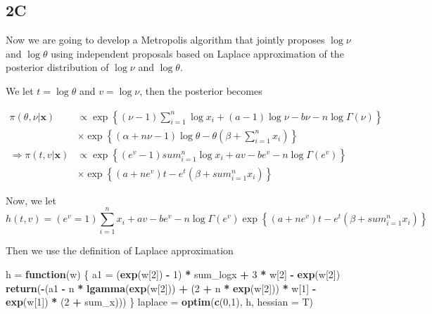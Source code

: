 \documentclass[]{article}
\newenvironment{Shaded}{\begin{snugshade}}{\end{snugshade}}
\newcommand{\KeywordTok}[1]{\textcolor[rgb]{0.13,0.29,0.53}{\textbf{#1}}}
\newcommand{\DataTypeTok}[1]{\textcolor[rgb]{0.13,0.29,0.53}{#1}}
\newcommand{\DecValTok}[1]{\textcolor[rgb]{0.00,0.00,0.81}{#1}}
\newcommand{\StringTok}[1]{\textcolor[rgb]{0.31,0.60,0.02}{#1}}
\newcommand{\ControlFlowTok}[1]{\textcolor[rgb]{0.13,0.29,0.53}{\textbf{#1}}}
\newcommand{\OperatorTok}[1]{\textcolor[rgb]{0.81,0.36,0.00}{\textbf{#1}}}
\newcommand{\NormalTok}[1]{#1}
\begin{document}
\subsection{2C}\label{c}

Now we are going to develop a Metropolis algorithm that jointly proposes
\(\log\nu\) and \(\log\theta\) using independent proposals based on
Laplace approximation of the posterior distribution of \(\log\nu\) and
\(\log\theta\).

We let \(t=\log\theta\) and \(v =\log\nu\), then the posterior becomes

\begin{align*} 
\pi(\theta,\nu|\pmb{x}) &\propto \exp\left\{(\nu -1) \sum_{i=1}^n \log x_i +(a -1)\log\nu - b\nu -n\log\Gamma(\nu) \right\}\\
&\times \exp\left\{(\alpha +n\nu-1)\log\theta -\theta\left(\beta + \sum_{i=1}^n x_i \right)\right\}\\
\Rightarrow \pi(t,v|\pmb{x}) &\propto \exp\left\{(e^v -1) sum_{i=1}^n \log x_i + av - be^v -n\log \Gamma(e^v)\right\}\\
&\times \exp\left\{(a +ne^v)t - e^t\left(\beta + sum_{i=1}^n x_i\right) \right\}
\end{align*}

Now, we let
\[h(t,v) = (e^v =1)\sum_{i=1}^n x_i + av -be^v-n\log \Gamma(e^v)\exp\left\{(a +ne^v)t - e^t\left(\beta + sum_{i=1}^n x_i\right) \right\}\]

Then we use the definition of Laplace approximation

\begin{Shaded}
\begin{Highlighting}[]
\NormalTok{h =}\StringTok{ }\ControlFlowTok{function}\NormalTok{(w) \{}
\NormalTok{  a1 =}\StringTok{ }\NormalTok{(}\KeywordTok{exp}\NormalTok{(w[}\DecValTok{2}\NormalTok{]) }\OperatorTok{-}\StringTok{ }\DecValTok{1}\NormalTok{) }\OperatorTok{*}\StringTok{ }\NormalTok{sum_logx }\OperatorTok{+}\StringTok{ }\DecValTok{3} \OperatorTok{*}\StringTok{ }\NormalTok{w[}\DecValTok{2}\NormalTok{] }\OperatorTok{-}\StringTok{ }\KeywordTok{exp}\NormalTok{(w[}\DecValTok{2}\NormalTok{])}
  \KeywordTok{return}\NormalTok{(}\OperatorTok{-}\NormalTok{(a1 }\OperatorTok{-}\StringTok{ }\NormalTok{n }\OperatorTok{*}\StringTok{ }\KeywordTok{lgamma}\NormalTok{(}\KeywordTok{exp}\NormalTok{(w[}\DecValTok{2}\NormalTok{])) }\OperatorTok{+}\StringTok{ }
\StringTok{             }\NormalTok{(}\DecValTok{2} \OperatorTok{+}\StringTok{ }\NormalTok{n }\OperatorTok{*}\StringTok{ }\KeywordTok{exp}\NormalTok{(w[}\DecValTok{2}\NormalTok{])) }\OperatorTok{*}\StringTok{ }\NormalTok{w[}\DecValTok{1}\NormalTok{] }\OperatorTok{-}\StringTok{ }\KeywordTok{exp}\NormalTok{(w[}\DecValTok{1}\NormalTok{]) }\OperatorTok{*}\StringTok{ }\NormalTok{(}\DecValTok{2} \OperatorTok{+}\StringTok{ }\NormalTok{sum_x)))}
\NormalTok{\}}
\NormalTok{laplace =}\StringTok{ }\KeywordTok{optim}\NormalTok{(}\KeywordTok{c}\NormalTok{(}\DecValTok{0}\NormalTok{,}\DecValTok{1}\NormalTok{), h, }\DataTypeTok{hessian =}\NormalTok{ T)}
\end{Highlighting}
\end{Shaded}
\end{document}
